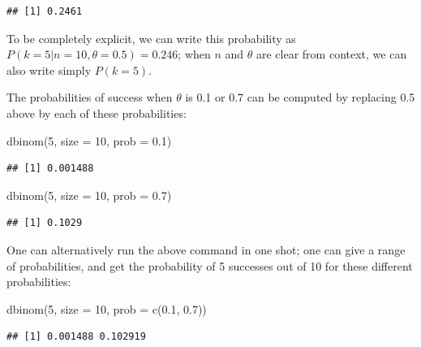 \documentclass[
  12pt,
]{krantz}
\newenvironment{Shaded}{\begin{snugshade}}{\end{snugshade}}
\newcommand{\AttributeTok}[1]{\textcolor[rgb]{0.77,0.63,0.00}{#1}}
\newcommand{\DecValTok}[1]{\textcolor[rgb]{0.00,0.00,0.81}{#1}}
\newcommand{\FloatTok}[1]{\textcolor[rgb]{0.00,0.00,0.81}{#1}}
\newcommand{\FunctionTok}[1]{\textcolor[rgb]{0.00,0.00,0.00}{#1}}
\newcommand{\NormalTok}[1]{#1}
\theoremstyle{definition}
\theoremstyle{definition}
\theoremstyle{definition}
\theoremstyle{definition}
\theoremstyle{remark}
\begin{document}
\begin{verbatim}
## [1] 0.2461
\end{verbatim}

To be completely explicit, we can write this probability as \(P(k=5|n=10,\theta=0.5)=0.246\); when \(n\) and \(\theta\) are clear from context, we can also write simply \(P(k=5)\).

The probabilities of success when \(\theta\) is 0.1 or 0.7 can be computed by replacing 0.5 above by each of these probabilities:

\begin{Shaded}
\begin{Highlighting}[]
\FunctionTok{dbinom}\NormalTok{(}\DecValTok{5}\NormalTok{, }\AttributeTok{size =} \DecValTok{10}\NormalTok{, }\AttributeTok{prob =} \FloatTok{0.1}\NormalTok{)}
\end{Highlighting}
\end{Shaded}

\begin{verbatim}
## [1] 0.001488
\end{verbatim}

\begin{Shaded}
\begin{Highlighting}[]
\FunctionTok{dbinom}\NormalTok{(}\DecValTok{5}\NormalTok{, }\AttributeTok{size =} \DecValTok{10}\NormalTok{, }\AttributeTok{prob =} \FloatTok{0.7}\NormalTok{)}
\end{Highlighting}
\end{Shaded}

\begin{verbatim}
## [1] 0.1029
\end{verbatim}

One can alternatively run the above command in one shot; one can give a range of probabilities, and get the probability of 5 successes out of 10 for these different probabilities:

\begin{Shaded}
\begin{Highlighting}[]
\FunctionTok{dbinom}\NormalTok{(}\DecValTok{5}\NormalTok{, }\AttributeTok{size =} \DecValTok{10}\NormalTok{, }\AttributeTok{prob =} \FunctionTok{c}\NormalTok{(}\FloatTok{0.1}\NormalTok{, }\FloatTok{0.7}\NormalTok{))}
\end{Highlighting}
\end{Shaded}

\begin{verbatim}
## [1] 0.001488 0.102919
\end{verbatim}
\end{document}
